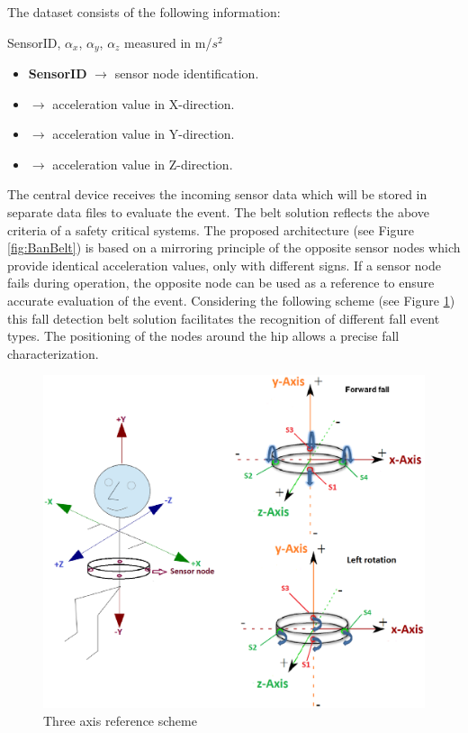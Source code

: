 \documentclass[10pt,journal,compsoc]{IEEEtran}
\begin{document}
The dataset consists of the following information: 
\begin{center}
	SensorID, $\alpha_{x}$, $\alpha_{y}$, $\alpha_{z}$ measured in m/$s^2$
\end{center}
\begin{itemize}
	\item \textbf{SensorID} $\rightarrow$ sensor node identification.
	\item {} $\rightarrow$ acceleration value in X-direction.
	\item {} $\rightarrow$ acceleration value in Y-direction.
	\item {} $\rightarrow$ acceleration value in Z-direction.
\end{itemize} 
The central device receives the incoming sensor data which will be stored in separate data files to evaluate the event. 
The belt solution reflects the above criteria of a safety critical systems. The proposed architecture (see Figure \ref{fig:BanBelt}) is based on a mirroring principle of the opposite sensor nodes which provide identical acceleration values, only with different signs. If a sensor node fails during operation, the opposite node can be used as a reference to ensure accurate evaluation of the event.  Considering the following scheme (see Figure \ref{fig:ReferenceScheme}) this fall detection belt solution facilitates the recognition of different fall event types. The positioning of the nodes around the hip allows a precise fall characterization.
\begin{figure}[!ht]
	\centering
	\includegraphics[scale=0.19]{Images/axis.eps}
	\caption[Three axis reference scheme]{Three axis reference scheme \cite{LaBlunda.2016,LuigiMasterThesis}}
	\label{fig:ReferenceScheme}
\end{figure}
\end{document}
